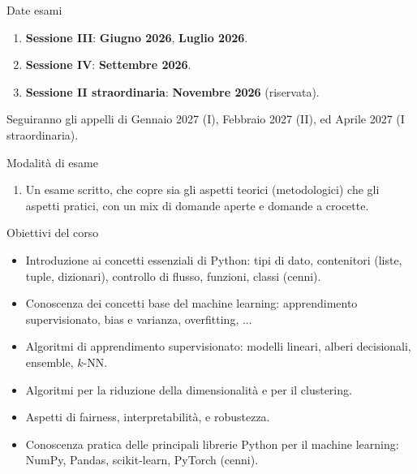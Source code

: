 \documentclass[12pt,aspectratio=169,notheorems]{beamer}
\begin{document}
\begin{frame}{Date esami}

	\begin{enumerate}
		\item \textbf{Sessione III}: \textbf{Giugno 2026}, \textbf{Luglio 2026}.
		\item \textbf{Sessione IV}: \textbf{Settembre 2026}.
		\item \textbf{Sessione II straordinaria}: \textbf{Novembre 2026} (riservata).
	\end{enumerate}

	Seguiranno gli appelli di Gennaio 2027 (I), Febbraio 2027 (II), ed Aprile 2027 (I straordinaria).

\end{frame}

\begin{frame}{Modalità di esame}

	\begin{enumerate}
		\item Un esame scritto, che copre sia gli aspetti teorici (metodologici) che gli aspetti pratici, con un mix di domande aperte e domande a crocette.
	\end{enumerate}

\end{frame}

\begin{frame}{Obiettivi del corso}

	\begin{itemize}
		\item Introduzione ai concetti essenziali di Python: tipi di dato, contenitori (liste, tuple, dizionari), controllo di flusso, funzioni, classi (cenni).
		\item Conoscenza dei concetti base del machine learning: apprendimento supervisionato, bias e varianza, overfitting, ...
		\item Algoritmi di apprendimento supervisionato: modelli lineari, alberi decisionali, ensemble, $k$-NN.
		\item Algoritmi per la riduzione della dimensionalità e per il clustering.
		\item Aspetti di fairness, interpretabilità, e robustezza.
		\item Conoscenza pratica delle principali librerie Python per il machine learning: NumPy, Pandas, scikit-learn, PyTorch (cenni).
	\end{itemize}

\end{frame}
\end{document}

